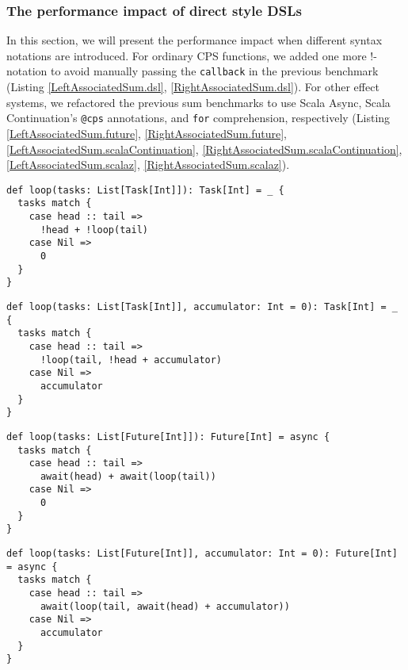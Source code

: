 \subsubsection{The performance impact of direct style DSLs}

In this section, we will present the performance impact when different syntax notations are introduced. For ordinary CPS functions, we added one more !-notation to avoid manually passing the \lstinline{callback} in the previous benchmark (Listing \ref{LeftAssociatedSum.dsl}, \ref{RightAssociatedSum.dsl}). For other effect systems, we refactored the previous sum benchmarks to use Scala Async, Scala Continuation's \lstinline{@cps} annotations, and \lstinline{for} comprehension, respectively (Listing \ref{LeftAssociatedSum.future}, \ref{RightAssociatedSum.future}, \ref{LeftAssociatedSum.scalaContinuation}, \ref{RightAssociatedSum.scalaContinuation}, \ref{LeftAssociatedSum.scalaz}, \ref{RightAssociatedSum.scalaz}).

\begin{lstlisting}[float=htbp,caption={Left-associated sum based on LDKs of \textit{Dsl.scala}},label={LeftAssociatedSum.dsl}]
def loop(tasks: List[Task[Int]]): Task[Int] = _ {
  tasks match {
    case head :: tail =>
      !head + !loop(tail)
    case Nil =>
      0
  }
}
\end{lstlisting}

\begin{lstlisting}[float=htbp,caption={Right-associated sum based on LDKs of \textit{Dsl.scala}},label={RightAssociatedSum.dsl}]
def loop(tasks: List[Task[Int]], accumulator: Int = 0): Task[Int] = _ {
  tasks match {
    case head :: tail =>
      !loop(tail, !head + accumulator)
    case Nil =>
      accumulator
  }
}
\end{lstlisting}

\begin{lstlisting}[float=htbp,caption={Left-associated sum based on Scala Async},label={LeftAssociatedSum.future}]
def loop(tasks: List[Future[Int]]): Future[Int] = async {
  tasks match {
    case head :: tail =>
      await(head) + await(loop(tail))
    case Nil =>
      0
  }
}
\end{lstlisting}

\begin{lstlisting}[float=htbp,caption={Right-associated sum based on Scala Async},label={RightAssociatedSum.future}]
def loop(tasks: List[Future[Int]], accumulator: Int = 0): Future[Int] = async {
  tasks match {
    case head :: tail =>
      await(loop(tail, await(head) + accumulator))
    case Nil =>
      accumulator
  }
}
\end{lstlisting}

